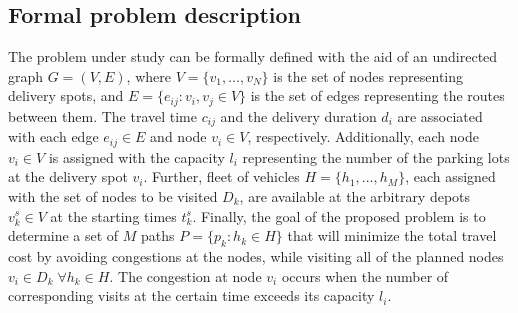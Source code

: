 \documentclass[conference]{IEEEtran}
\begin{document}
\subsection{Formal problem description}
\label{subsec:formal}

The problem under study can be formally defined with the aid of an undirected graph $ G = (V, E) $, where $ V = \lbrace  v_1, ... , v_N \rbrace $ is the set of nodes representing delivery spots, and $ E = \lbrace e_{ij}: v_i,v_j \in V \rbrace $ %
is the set of edges representing the routes between them. The travel time $ c_{ij} $ and the delivery duration $ d_i $ are associated with each edge $ e_{ij} \in E $ and node $ v_i \in V $, respectively. Additionally, each node $v_i \in V$ is assigned with the capacity $ l_i $ representing the number of the parking lots at the delivery spot $ v_i $.
Further, fleet of vehicles $ H = \{h_1, ... , h_M \} $, each assigned with the set of nodes to be visited $ D_k $, are available at the arbitrary depots $v_k^s \in V $ at the starting times $ t_k^s $. Finally, the goal of the proposed problem is to determine a set of $ M $ paths $ P = \{ p_k : h_k \in H \} $ that will minimize the total travel cost by avoiding congestions at the nodes, while visiting all of the planned nodes $ v_i \in D_k\; \forall h_k \in H $. The congestion at node $ v_i $ occurs when the number of corresponding visits at the certain time exceeds its capacity $ l_i $.
\end{document}
